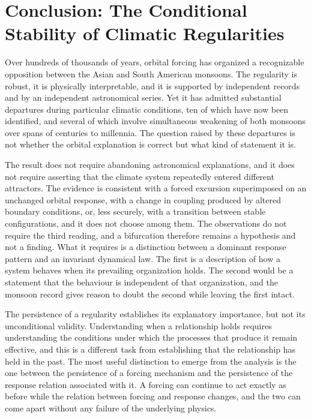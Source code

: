 \documentclass[11pt]{article}
\theoremstyle{definition}
\begin{document}
\section{Conclusion: The Conditional Stability of Climatic Regularities}

Over hundreds of thousands of years, orbital forcing has organized a recognizable opposition between the Asian and South American monsoons. The regularity is robust, it is physically interpretable, and it is supported by independent records and by an independent astronomical series. Yet it has admitted substantial departures during particular climatic conditions, ten of which have now been identified, and several of which involve simultaneous weakening of both monsoons over spans of centuries to millennia. The question raised by these departures is not whether the orbital explanation is correct but what kind of statement it is.

The result does not require abandoning astronomical explanations, and it does not require asserting that the climate system repeatedly entered different attractors. The evidence is consistent with a forced excursion superimposed on an unchanged orbital response, with a change in coupling produced by altered boundary conditions, or, less securely, with a transition between stable configurations, and it does not choose among them. The observations do not require the third reading, and a bifurcation therefore remains a hypothesis and not a finding. What it requires is a distinction between a dominant response pattern and an invariant dynamical law. The first is a description of how a system behaves when its prevailing organization holds. The second would be a statement that the behaviour is independent of that organization, and the monsoon record gives reason to doubt the second while leaving the first intact.

The persistence of a regularity establishes its explanatory importance, but not its unconditional validity. Understanding when a relationship holds requires understanding the conditions under which the processes that produce it remain effective, and this is a different task from establishing that the relationship has held in the past. The most useful distinction to emerge from the analysis is the one between the persistence of a forcing mechanism and the persistence of the response relation associated with it. A forcing can continue to act exactly as before while the relation between forcing and response changes, and the two can come apart without any failure of the underlying physics.
\end{document}

